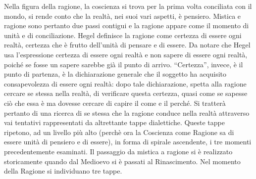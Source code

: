 \documentclass[a4paper,12pt,oneside,openany]{book}%
\begin{document}
Nella figura della ragione, la coscienza si trova per la prima volta conciliata con il mondo, si rende conto che la realtà, nei suoi vari aspetti, è pensiero. Mistica e ragione sono pertanto due passi contigui e la ragione appare come il momento di unità e di conciliazione. Hegel definisce la ragione come certezza di essere ogni realtà, certezza che è frutto dell’unità di pensare e di essere. Da notare che Hegel usa l’espressione certezza di essere ogni realtà e non sapere di essere ogni realtà, poiché se fosse un sapere sarebbe già il punto di arrivo. “Certezza”, invece, è il punto di partenza, è la dichiarazione generale che il soggetto ha acquisito consapevolezza di essere ogni realtà: dopo tale dichiarazione, spetta alla ragione cercare se stessa nella realtà, di verificare questa certezza, quasi come se sapesse ciò che essa è ma dovesse cercare di capire il come e il perché. Si tratterà pertanto di una ricerca di se stessa che la ragione conduce nella realtà attraverso vai tentativi rappresentati da altrettante tappe dialettiche. Queste tappe ripetono, ad un livello più alto (perchè ora la Coscienza come Ragione sa di essere unità di pensiero e di essere), in forma di spirale ascendente, i tre momenti precedentemente esaminati. Il passaggio da mistica a ragione si è realizzato storicamente quando dal Medioevo si è passati al Rinascimento. Nel momento della Ragione si individuano tre tappe.
\end{document}
